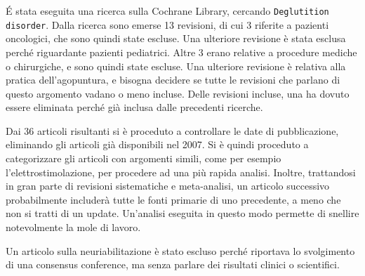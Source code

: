 \'E stata eseguita una ricerca sulla Cochrane Library, cercando 
\texttt{Deglutition disorder}.
Dalla ricerca sono emerse 13 revisioni, di cui 3 riferite a pazienti 
oncologici, che sono quindi state escluse.
Una ulteriore revisione è stata esclusa perché riguardante pazienti pediatrici.
Altre 3 erano relative a procedure mediche o chirurgiche, e sono quindi state 
escluse.
Una ulteriore revisione è relativa alla pratica dell'agopuntura, e bisogna 
decidere se tutte le revisioni che parlano di questo argomento vadano o meno 
incluse.
Delle revisioni incluse, una ha dovuto essere eliminata perché già inclusa 
dalle precedenti ricerche.

Dai 36 articoli risultanti si è proceduto a controllare le date di 
pubblicazione, eliminando gli articoli già disponibili nel 2007.
Si è quindi proceduto a categorizzare gli articoli con argomenti simili, come 
per esempio l'elettrostimolazione, per procedere ad una più rapida analisi.
Inoltre, trattandosi in gran parte di revisioni sistematiche e meta-analisi, un 
articolo successivo probabilmente includerà tutte le fonti primarie di uno 
precedente, a meno che non si tratti di un update.
Un'analisi eseguita in questo modo permette di snellire notevolmente la mole di 
lavoro.

Un articolo sulla neuriabilitazione è stato escluso perché riportava lo 
svolgimento di una consensus conference, ma senza parlare dei risultati clinici 
o scientifici.
 
